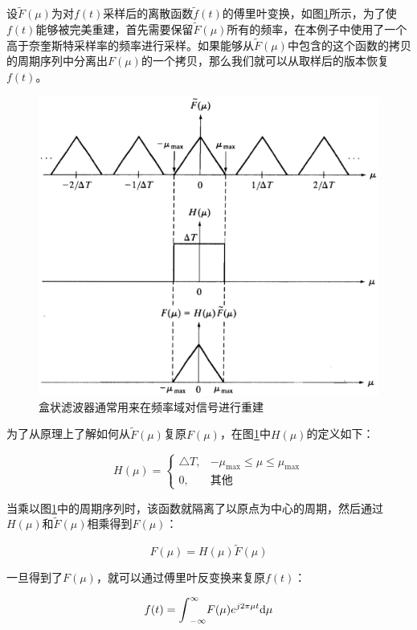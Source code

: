 设$\tilde{F}(\mu)$为对$f(t)$采样后的离散函数$\tilde{f}(t)$的傅里叶变换，如图\ref{f:intro-reconstruction}所示，为了使$f(t)$能够被完美重建，首先需要保留$\tilde{F}(\mu)$所有的频率，在本例子中使用了一个高于奈奎斯特采样率的频率进行采样。如果能够从$\tilde{F}(\mu)$中包含的这个函数的拷贝的周期序列中分离出$F(\mu)$的一个拷贝，那么我们就可以从取样后的版本恢复$f(t)$。

\begin{figure}
\sidecaption
	\includegraphics[width=.65\textwidth]{figures/intro/reconstruction}
	\caption{盒状滤波器通常用来在频率域对信号进行重建}
	\label{f:intro-reconstruction}
\end{figure}

为了从原理上了解如何从$\tilde{F}(\mu)$复原$F(\mu)$，在图\ref{f:intro-reconstruction}中$H(\mu)$的定义如下：

\begin{equation}
	H(\mu)=\begin{cases}
		\triangle T, & -\mu_{\max}\leq\mu\leq\mu_{\max}\\
		0,           & 其他
	\end{cases}
\end{equation}

\noindent 当乘以图\ref{f:intro-reconstruction}中的周期序列时，该函数就隔离了以原点为中心的周期，然后通过$H(\mu)$和$\tilde{F}(\mu)$相乘得到$F(\mu)$：

\begin{equation}\label{eq:intro-reconstruction}
	F(\mu)=H(\mu)\tilde{F}(\mu)
\end{equation}

\noindent 一旦得到了$F(\mu)$，就可以通过傅里叶反变换来复原$f(t)$：

\begin{equation}
	f(t)={\rm \int}^{\infty}_{-\infty}F(\mu)e^{j2\pi\mu t} {\rm d}\mu
\end{equation}

